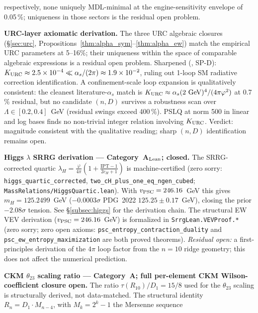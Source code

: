 \documentclass[11pt]{article}
\theoremstyle{remark}
\begin{document}
{\begin{description}[leftmargin=2em,labelindent=0.5em,itemsep=0.28em]
  respectively, none uniquely MDL-minimal at the engine-sensitivity envelope of
  0.05\,\%; uniqueness in those sectors is the residual open problem.
  \item[(iii)] \textbf{URC-layer axiomatic derivation.} The three URC algebraic closures (\S\ref{sec:urc}, Propositions~\ref{thm:alpha_sym}--\ref{thm:alpha_ew}) match the empirical URC parameters at 5--16\%; their uniqueness within the space of comparable algebraic expressions is a residual open problem.
  Sharpened (\cite{Spivack2026_Uniqueness25}, SP-D): $K_{\rm URC} \approx 2.5 \times 10^{-4} \ll \alpha_s/(2\pi) \approx 1.9 \times 10^{-2}$, ruling out 1-loop SM radiative correction identification.  A confinement-scale loop expansion is qualitatively consistent: the cleanest literature-$\alpha_s$ match is $K_{\rm URC} \approx \alpha_s(2~\text{GeV})^4/(4\pi\varphi^2)$ at 0.7\,\% residual, but no candidate $(n, D)$ survives a robustness scan over $\Lambda \in [0.2, 0.4]$~GeV (residual swings exceed 400\,\%).  PSLQ at norm 500 in linear and log bases finds no non-trivial integer relation involving $K_{\rm URC}$.  Verdict: magnitude consistent with the qualitative reading; sharp $(n,D)$ identification remains open.
  \item[(iv)] \textbf{Higgs $\lambda$ SRRG derivation --- Category~A$_{\rm Lean}$; closed.}
  The SRRG-corrected quartic $\lambda_H = \frac{\varphi}{4\pi}(1 + \frac{\mathrm{IPT}-1}{2c_H+1})$
  is machine-certified (zero sorry: \texttt{higgs\_quartic\_corrected},
  \texttt{two\_cH\_plus\_one\_eq\_ngen\_cubed}; \texttt{MassRelations/HiggsQuartic.lean}).
  With $v_{\rm PSC} = 246.16$~GeV this gives $m_H = 125.2499$~GeV ($-0.0003\sigma$ PDG~2022
  $125.25 \pm 0.17$~GeV), closing the prior $-2.08\sigma$ tension.
  See \S\ref{subsec:higgs} for the derivation chain.
  The structural EW VEV derivation ($v_{\rm PSC} = 246.16$~GeV) is formalized in
  \texttt{SrrgLean.VEVProof.*}~\cite{SpivackSRRG} (zero sorry; zero open axioms:
  \texttt{psc\_entropy\_contraction\_duality} and
  \texttt{psc\_ew\_entropy\_maximization} are both proved theorems).
  \emph{Residual open:} a first-principles derivation of the $4\pi$ loop factor from the $n=10$
  ridge geometry; this does not affect the numerical prediction.
  \item[(v)] \textbf{CKM $\theta_{23}$ scaling ratio --- Category~A; full
  per-element CKM Wilson-coefficient closure open.}
  The ratio $\tau(R_{10})/D_1 = 15/8$ used for the $\theta_{23}$ scaling is
  structurally derived, not data-matched.  The structural identity
  $R_n = D_1 \cdot M_{n-4}$, with $M_k = 2^k - 1$ the Mersenne sequence

\end{description}}
\end{document}

